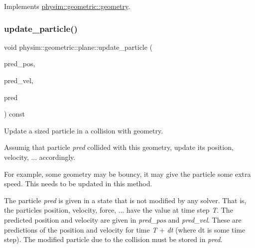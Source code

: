 Implements \hyperlink{classphysim_1_1geometric_1_1geometry_ae5d606ba51451b964fcb2301d5622cab}{physim\+::geometric\+::geometry}.

\mbox{\label{classphysim_1_1geometric_1_1plane_aff9bd840500b32eeefb89ac0a7d9b95f}} 
\subsubsection{\texorpdfstring{update\+\_\+particle()}{update\_particle()}\hspace{0.1cm}{\footnotesize\ttfamily [2/2]}}
{\footnotesize\ttfamily void physim\+::geometric\+::plane\+::update\+\_\+particle (\begin{DoxyParamCaption}\item[{const \hyperlink{structphysim_1_1math_1_1vec3}{math\+::vec3} \&}]{pred\+\_\+pos,  }\item[{const \hyperlink{structphysim_1_1math_1_1vec3}{math\+::vec3} \&}]{pred\+\_\+vel,  }\item[{\hyperlink{classphysim_1_1particles_1_1sized__particle}{particles\+::sized\+\_\+particle} \&}]{pred }\end{DoxyParamCaption}) const\hspace{0.3cm}{\ttfamily [virtual]}}



Update a sized particle in a collision with geometry. 

Assumig that particle {\itshape pred} collided with this geometry, update its position, velocity, ... accordingly.

For example, some geometry may be \textquotesingle{}bouncy\textquotesingle{}, it may give the particle some extra speed. This needs to be updated in this method.

The particle {\itshape pred} is given in a state that is not modified by any solver. That is, the particle\textquotesingle{}s position, velocity, force, ... have the value at time step {\itshape T}. The predicted position and velocity are given in {\itshape pred\+\_\+pos} and {\itshape pred\+\_\+vel}. These are predictions of the position and velocity for time {\itshape T} + {\itshape dt} (where dt is some time step). The modified particle due to the collision must be stored in {\itshape pred}.

